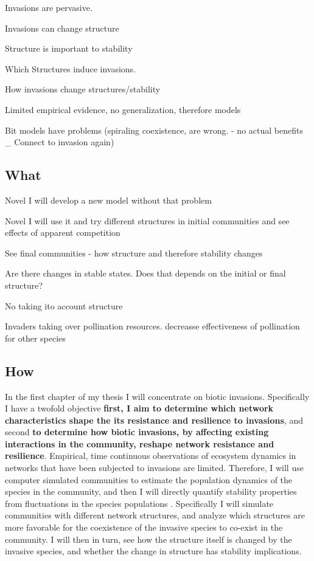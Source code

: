 \documentclass[a4paper]{report}
\begin{document}
Invasions are pervasive.

Invasions can change structure

Structure is important to stability

Which Structures induce invasions.

How invasions change structures/stability

Limited empirical evidence, no generalization, therefore models

Bit models have problems (spiraling coexistence, are wrong. - no actual benefits _ Connect to invasion again)

\subsection*{What}

Novel I will develop a new model without that problem

Novel I will use it and try different structures in initial communities and see effects of apparent competition

See final communities - how structure and therefore stability changes

Are there changes in stable states. Does that depends on the initial or final structure?


No taking ito account structure

Invaders taking over pollination resources. decreasse effectiveness of pollination for other species






\subsection*{How}

In the first chapter of my thesis I will concentrate on biotic invasions.
Specifically I have a twofold objective \textbf{first, I aim to determine which network characteristics shape the its resistance and resilience to invasions}, and second \textbf{to determine how biotic invasions, by affecting existing interactions in the community, reshape network resistance and resilience}.
Empirical, time continuous observations of ecosystem dynamics in networks that have been subjected to invasions are limited.
Therefore, I will use computer simulated communities to estimate the population dynamics of the species in the community, and then I will directly quantify stability properties from fluctuations in the species populations \citep{Bastolla2009, Garcia-Algarra2013}.
Specifically I will simulate communities with different network structures, and analyze which structures are more favorable for the coexistence of the invasive species to co-exist in the community.
I will then in turn, see how the structure itself is changed by the invasive species, and whether the change in structure has stability implications.
\end{document}
